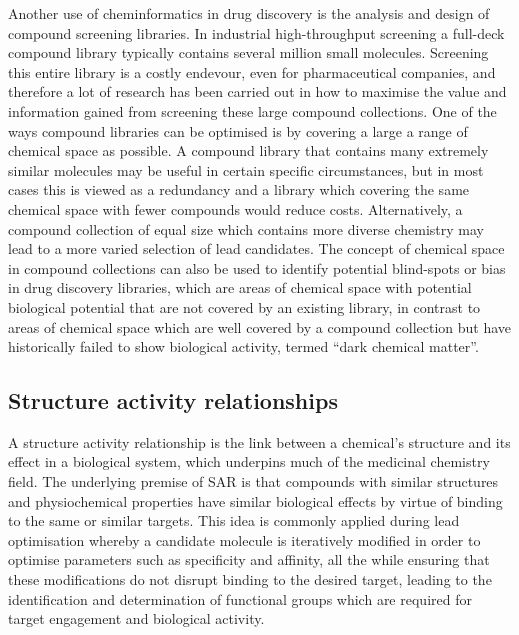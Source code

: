 \documentclass[a4paper,11pt,twoside,openright]{scrbook}
\begin{document}
Another use of cheminformatics in drug discovery is the analysis and design of compound screening libraries.
In industrial high-throughput screening a full-deck compound library typically contains several million small molecules.
Screening this entire library is a costly endevour, even for pharmaceutical companies, and therefore a lot of research has been carried out in how to maximise the value and information gained from screening these large compound collections.
One of the ways compound libraries can be optimised is by covering a large a range of chemical space as possible.
A compound library that contains many extremely similar molecules may be useful in certain specific circumstances, but in most cases this is viewed as a redundancy and a library which covering the same chemical space with fewer compounds would reduce costs.
Alternatively, a compound collection of equal size which contains more diverse chemistry may lead to a more varied selection of lead candidates. \cite{Clemons2011}
The concept of chemical space in compound collections can also be used to identify potential blind-spots or bias in drug discovery libraries, which are areas of chemical space with potential biological potential that are not covered by an existing library, in contrast to areas of chemical space which are well covered by a compound collection but have historically failed to show biological activity, termed ``dark chemical matter''. \cite{Wassermann2015}


\subsection{Structure activity relationships}
A structure activity relationship is the link between a chemical's structure and its effect in a biological system, which underpins much of the medicinal chemistry field.
The underlying premise of SAR is that compounds with similar structures and physiochemical properties have similar biological effects by virtue of binding to the same or similar targets.
This idea is commonly applied during lead optimisation whereby a candidate molecule is iteratively modified in order to optimise parameters such as specificity and affinity, all the while ensuring that these modifications do not disrupt binding to the desired target, leading to the identification and determination of functional groups which are required for target engagement and biological activity.
\end{document}
